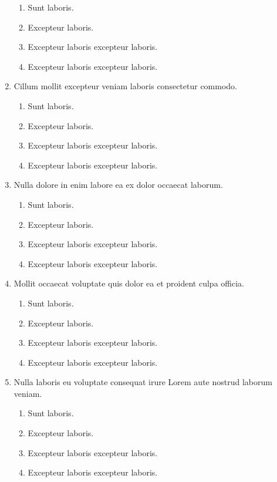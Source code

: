 \documentclass[a4paper,12pt]{article}
\begin{document}
\begin{enumerate}[label=\textbf{\arabic*.}]
  \begin{enumerate}
    \item Sunt laboris.
    \item Excepteur laboris.
    \item Excepteur laboris excepteur laboris.
    \item Excepteur laboris excepteur laboris.
  \end{enumerate}
  \item Cillum mollit excepteur veniam laboris consectetur commodo.
  \begin{enumerate}
    \item Sunt laboris.
    \item Excepteur laboris.
    \item Excepteur laboris excepteur laboris.
    \item Excepteur laboris excepteur laboris.
  \end{enumerate}
  \item Nulla dolore in enim labore ea ex dolor occaecat laborum.
  \begin{enumerate}
    \item Sunt laboris.
    \item Excepteur laboris.
    \item Excepteur laboris excepteur laboris.
    \item Excepteur laboris excepteur laboris.
  \end{enumerate}
  \item Mollit occaecat voluptate quis dolor ea et proident culpa officia.
  \begin{enumerate}
    \item Sunt laboris.
    \item Excepteur laboris.
    \item Excepteur laboris excepteur laboris.
    \item Excepteur laboris excepteur laboris.
  \end{enumerate}
  \item Nulla laboris eu voluptate consequat irure Lorem aute nostrud laborum veniam.
  \begin{enumerate}
    \item Sunt laboris.
    \item Excepteur laboris.
    \item Excepteur laboris excepteur laboris.
    \item Excepteur laboris excepteur laboris.
  \end{enumerate}

\end{enumerate}
\end{document}
